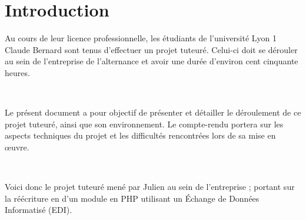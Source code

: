 \chapter*{Introduction}
Au cours de leur licence professionnelle, les étudiants de l'université Lyon 1 Claude Bernard sont tenus d'effectuer un projet tuteuré. Celui-ci doit se dérouler au sein de l'entreprise de l'alternance et avoir une durée d'environ cent cinquante heures.

~

Le présent document a pour objectif de présenter et détailler le déroulement de ce projet tuteuré, ainsi que son environnement. Le compte-rendu portera sur les aspects techniques du projet et les difficultés rencontrées lors de sa mise en \oe uvre.

~
	
Voici donc le projet tuteuré mené par Julien  au sein de l'entreprise \solulog{} ;  portant sur la réécriture en \vb{} d'un module en PHP utilisant un \'Echange de Données Informatisé (EDI).